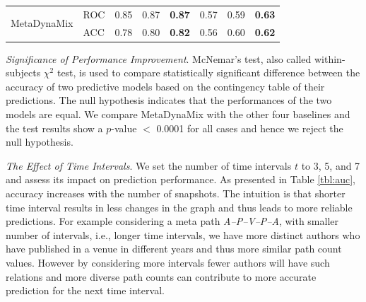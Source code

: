 \begin{table}[t]
\begin{tabular}{ll|p{1cm}|p{1cm}|p{1cm}||p{1cm}|p{1cm}|p{1cm}|}
\multicolumn{1}{|l|}{\multirow{2}{*}{MetaDynaMix}}  & ROC  & 0.85 &  0.87 & \textbf{0.87}   &  0.57  & 0.59 &  \textbf{0.63}  \\ \cline{2-8}
\multicolumn{1}{|l|}{}  & ACC  & 0.78 & 0.80 & \textbf{0.82}   & 0.56  &  0.60  &   \textbf{0.62} \\ \hline

\end{tabular}
\end{table}





\textit{Significance of Performance Improvement}. McNemar's test, also called within-subjects $\chi^2$ test, is used to compare statistically significant difference between the accuracy of two predictive models based on the contingency table of their predictions. The null hypothesis indicates that the performances of the two models are equal. We compare MetaDynaMix with the other four baselines and the test results show a $p$-value $<$ 0.0001 for all cases and hence we reject the null hypothesis.

%    
%    
%
    
    


\textit{The Effect of Time Intervals}. We set the number of time intervals $t$ to 3, 5, and 7 and assess its impact on prediction performance. As presented in Table \ref{tbl:auc}, accuracy increases with the number of snapshots. The intuition is that shorter time interval results in less changes in the graph and thus leads to more reliable predictions. For example considering a meta path \textit{A--P--V--P--A}, with smaller number of intervals, i.e., longer time intervals, we have more distinct authors who have published in a venue in different years and thus more similar path count values. However by considering more intervals fewer authors will have such relations and more diverse path counts can contribute to more accurate prediction for the next time interval.


